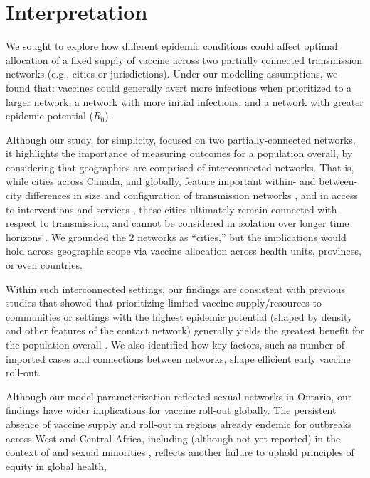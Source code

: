 \section{Interpretation}
We sought to explore how different epidemic conditions
could affect optimal allocation of a fixed supply of \MPXV vaccine
across two partially connected transmission networks (e.g., cities or jurisdictions).
Under our modelling assumptions, we found that:
vaccines could generally avert more infections when prioritized to
a larger network,
a network with more initial infections, and
a network with greater epidemic potential ($R_0$).
\par
Although our study, for simplicity, focused on two partially-connected networks,
it highlights the importance of measuring outcomes for a population overall,
by considering that geographies are comprised of interconnected networks.
That is, while cities across Canada, and globally,
feature important within- and between-city differences
in size and configuration of transmission networks \cite{Scott2015,Gesink2018},
and in access to interventions and services \cite{Millett2012,Hart2021,Doran2021},
these cities ultimately remain connected with respect to transmission,
and cannot be considered in isolation over longer time horizons
\cite{Bogoch2015,Gesink2018,Armstrong2020}.
We grounded the 2 networks as ``cities,'' but the implications would hold
across geographic scope via vaccine allocation across
health units, provinces, or even countries.
\par
Within such interconnected settings,
our findings are consistent with previous studies that showed that
prioritizing limited vaccine supply/resources to communities or settings
with the highest epidemic potential (shaped by density and other features of the contact network)
generally yields the greatest benefit for the population overall
\cite{Garnett2005,Anderson2014,Mishra2021}.
We also identified how key factors,
such as number of imported cases and connections between networks,
shape efficient early vaccine roll-out.
\par
Although our model parameterization reflected \GBMSM sexual networks in Ontario,
our findings have wider implications for vaccine roll-out globally.
The persistent absence of vaccine supply and roll-out in
regions already endemic for \MPXV outbreaks across West and Central Africa,
including (although not yet reported) in the context of \GBMSM and sexual minorities \cite{Manirambona2022},
reflects another failure to uphold principles of equity in global health,

